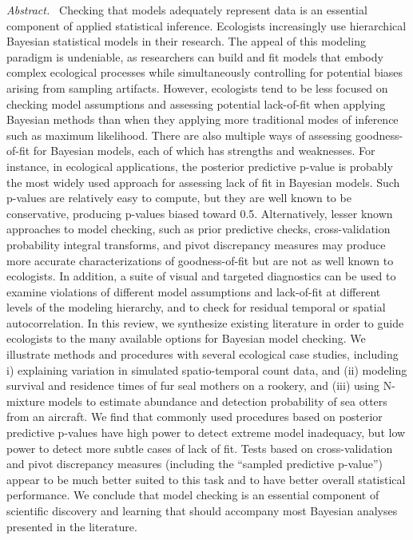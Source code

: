 \documentclass[12pt,english]{article}
\begin{document}
\begin{spacing}{1.9}
{\em Abstract.\ } Checking that models adequately represent data is an
essential component of applied statistical inference.  Ecologists
increasingly use hierarchical Bayesian statistical models in their
research.  The appeal of this modeling paradigm is undeniable, as
researchers can build and fit models that embody complex ecological
processes while simultaneously controlling for potential biases
arising from sampling artifacts. However, ecologists tend to be less
focused on checking model assumptions and assessing potential
lack-of-fit when applying Bayesian methods than when they applying
more traditional modes of inference such as maximum likelihood.  There
are also multiple ways of assessing goodness-of-fit for Bayesian
models, each of which has strengths and weaknesses.  For instance, in
ecological applications, the posterior predictive p-value is probably
the most widely used approach for assessing lack of fit in Bayesian
models. Such p-values are relatively easy to compute, but they are
well known to be conservative, producing p-values biased toward 0.5.
Alternatively, lesser known approaches to model checking, such as
prior predictive checks, cross-validation probability integral
transforms, and pivot discrepancy measures may produce more accurate
characterizations of goodness-of-fit but are not as well known to
ecologists.  In addition, a suite of visual and targeted diagnostics
can be used to examine violations of different model assumptions and
lack-of-fit at different levels of the modeling hierarchy, and to
check for residual temporal or spatial autocorrelation.  In this
review, we synthesize existing literature in order to guide ecologists
to the many available options for Bayesian model checking.  We
illustrate methods and procedures with several ecological case
studies, including i) explaining variation in simulated
spatio-temporal count data, and (ii) modeling survival and residence
times of fur seal mothers on a rookery, and (iii) using N-mixture
models to estimate abundance and detection probability of sea otters
from an aircraft.  We find that commonly used procedures based on
posterior predictive p-values have high power to detect extreme model
inadequacy, but low power to detect more subtle cases of lack of fit.
Tests based on cross-validation and pivot discrepancy measures
(including the ``sampled predictive p-value'') appear to be much
better suited to this task and to have better overall statistical
performance. We conclude that model checking is an essential component
of scientific discovery and learning that should accompany most
Bayesian analyses presented in the literature.



\end{spacing}
\end{document}
